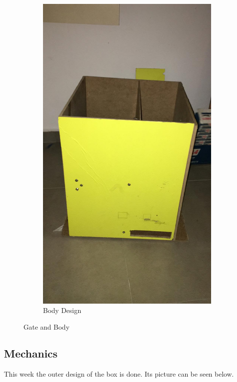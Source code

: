 \begin{figure}[h]
\begin{subfigure}[b]{0.49\linewidth}
     \includegraphics[width=\linewidth]{content/Kutu.jpeg}
     \caption {Body Design}
     \label{fig:body}
     \end{subfigure}
     \caption{Gate and Body}
     \label{fig:bodyandgate}
\end{figure}


\subsection{Mechanics}
This week the outer design of the box is done. Its picture can be seen below. 




